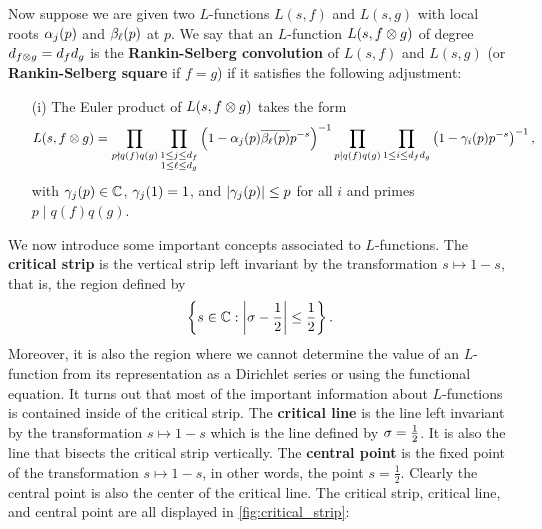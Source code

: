     Now suppose we are given two $L$-functions $L(s,f)$ and $L(s,g)$ with local roots $\alpha_{j}(p)$ and $\beta_{\ell}(p)$ at $p$. We say that an $L$-function $L(s,f \otimes g)$ of degree $d_{f \otimes g} = d_{f}d_{g}$ is the \textbf{Rankin-Selberg convolution} of $L(s,f)$ and $L(s,g)$ (or \textbf{Rankin-Selberg square} if $f = g$) if it satisfies the following adjustment:
    \begin{itemize}
      \item[(i)] The Euler product of $L(s,f \otimes g)$ takes the form
      \[
        L(s,f \otimes g) = \prod_{p \nmid q(f)q(g)}\prod_{\substack{1 \le j \le d_{f} \\ 1 \le \ell \le d_{g}}}\left(1-\alpha_{j}(p)\overline{\beta_{\ell}(p)}p^{-s}\right)^{-1}\prod_{p \mid q(f)q(g)}\prod_{1 \le i \le d_{f}d_{g}}\left(1-\gamma_{i}(p)p^{-s}\right)^{-1},
      \]
      with $\gamma_{j}(p) \in \mathbb{C}$, $\gamma_{j}(1) = 1$, and $|\gamma_{j}(p)| \le p$ for all $i$ and primes $p \mid q(f)q(g)$. 
    \end{itemize}
    We now introduce some important concepts associated to $L$-functions. The \textbf{critical strip} is the vertical strip left invariant by the transformation $s \mapsto 1-s$, that is, the region defined by
    \[
      \left\{s \in \mathbb{C}:\left|\sigma-\frac{1}{2}\right| \le \frac{1}{2}\right\}.
    \]
    Moreover, it is also the region where we cannot determine the value of an $L$-function from its representation as a Dirichlet series or using the functional equation. It turns out that most of the important information about $L$-functions is contained inside of the critical strip. The \textbf{critical line} is the line left invariant by the transformation $s \mapsto 1-s$ which is the line defined by $\sigma = \frac{1}{2}$. It is also the line that bisects the critical strip vertically. The \textbf{central point} is the fixed point of the transformation $s \mapsto 1-s$, in other words, the point $s = \frac{1}{2}$. Clearly the central point is also the center of the critical line. The critical strip, critical line, and central point are all displayed in \cref{fig:critical_strip}:

